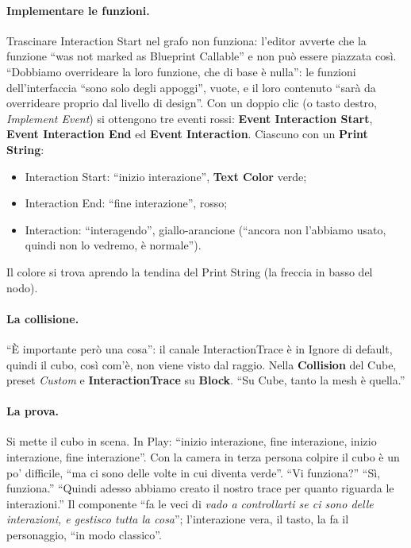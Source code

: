 \paragraph{Implementare le funzioni.} Trascinare Interaction Start nel grafo non funziona:
l'editor avverte che la funzione ``was not marked as Blueprint Callable'' e non può essere
piazzata così. ``Dobbiamo overrideare la loro funzione, che di base è nulla'': le funzioni
dell'interfaccia ``sono solo degli appoggi'', vuote, e il loro contenuto ``sarà da
overrideare proprio dal livello di design''. Con un doppio clic (o tasto destro,
\emph{Implement Event}) si ottengono tre eventi rossi: \textbf{Event Interaction Start},
\textbf{Event Interaction End} ed \textbf{Event Interaction}. Ciascuno con un
\textbf{Print String}:
\begin{itemize}
  \item Interaction Start: ``inizio interazione'', \textbf{Text Color} verde;
  \item Interaction End: ``fine interazione'', rosso;
  \item Interaction: ``interagendo'', giallo-arancione (``ancora non l'abbiamo usato,
        quindi non lo vedremo, è normale'').
\end{itemize}
Il colore si trova aprendo la tendina del Print String (la freccia in basso del nodo).

\paragraph{La collisione.} ``È importante però una cosa'': il canale InteractionTrace è in
Ignore di default, quindi il cubo, così com'è, non viene visto dal raggio. Nella
\textbf{Collision} del Cube, preset \emph{Custom} e \textbf{InteractionTrace} su
\textbf{Block}. ``Su Cube, tanto la mesh è quella.''

\paragraph{La prova.} Si mette il cubo in scena. In Play: ``inizio interazione, fine
interazione, inizio interazione, fine interazione''. Con la camera in terza persona colpire
il cubo è un po' difficile, ``ma ci sono delle volte in cui diventa verde''. ``Vi funziona?''
``Sì, funziona.'' ``Quindi adesso abbiamo creato il nostro trace per quanto riguarda le
interazioni.'' Il componente ``fa le veci di \emph{vado a controllarti se ci sono delle
interazioni, e gestisco tutta la cosa}''; l'interazione vera, il tasto, la fa il personaggio,
``in modo classico''.

